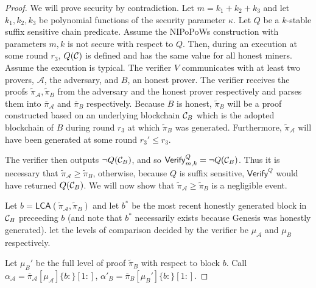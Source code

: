 \begin{proof}
    We will prove security by contradiction.  Let $m = k_1 + k_2 + k_3$ and let
    $k_1, k_2, k_3$ be polynomial functions of the security parameter $\kappa$.
    Let $Q$ be a $k$-stable suffix sensitive chain predicate. Assume the
    NIPoPoWs construction with parameters $m, k$ is not secure with respect to
    $Q$. Then, during an execution at some round $r_3$, $Q(\mathcal{C})$ is defined
    and has the same value for all honest miners.  Assume the execution is
    typical. The verifier $V$ communicates with at least two provers,
    $\mathcal{A}$, the adversary, and $B$, an honest prover.  The verifier
    receives the proofs $\tilde\pi_\mathcal{A}, \tilde\pi_B$ from the adversary
    and the honest prover respectively and parses them into
    $\overline\pi_\mathcal{A}$ and $\overline\pi_B$ respectively. Because $B$ is
    honest, $\tilde\pi_B$ will be a proof constructed based on an underlying
    blockchain $\mathcal{C}_B$ which is the adopted blockchain of $B$ during round
    $r_3$ at which $\tilde\pi_B$ was generated. Furthermore,
    $\tilde\pi_\mathcal{A}$ will have been generated at some round $r_3' \leq
    r_3$.

    The verifier then outputs $\lnot Q(\mathcal{C}_B)$, and so
    $\textsf{Verify}^Q_{m,k} = \lnot Q(\mathcal{C}_B)$. Thus it is necessary that
    $\tilde\pi_\mathcal{A} \geq \tilde\pi_B$, otherwise, because $Q$
    is suffix sensitive, $\textsf{Verify}^Q$ would have returned $Q(\mathcal{C}_B)$.
    We will now show that $\tilde\pi_\mathcal{A} \geq \tilde\pi_B$ is
    a negligible event.

    Let $b = \textsf{LCA}(\tilde\pi_\mathcal{A}, \tilde\pi_B)$ and let $b^*$ be
    the most recent honestly generated block in $\mathcal{C}_B$ preceeding $b$ (and note that $b^*$ necessarily exists because Genesis was honestly generated).
    let the levels of comparison decided by the verifier be $\mu_\mathcal{A}$
    and $\mu_B$ respectively.

    Let $\mu_B'$ be the full level of proof $\tilde\pi_B$ with respect to block
    $b$. Call $\alpha_\mathcal{A} =
    \overline\pi_\mathcal{A}[\mu_\mathcal{A}]\{b:\}[1:]$,
    $\alpha'_B = \overline\pi_B[\mu_B']\{b:\}[1:]$.



\end{proof}
